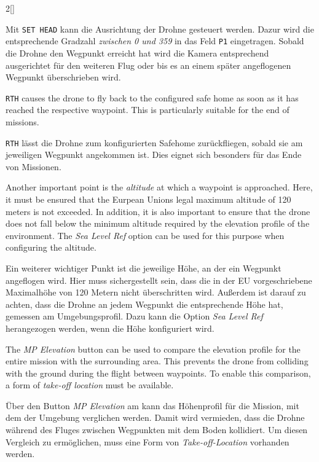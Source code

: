 \begin{paracol}{2}[]
\colger

Mit \texttt{SET HEAD} kann die Ausrichtung der Drohne gesteuert werden. Dazur wird die entsprechende Gradzahl \textsl{zwischen 0 und 359 }in das Feld \texttt{P1} eingetragen. Sobald die Drohne den Wegpunkt erreicht hat wird die Kamera entsprechend ausgerichtet für den weiteren Flug oder bis es an einem später angeflogenen Wegpunkt überschrieben wird.

\coleng

\texttt{RTH} causes the drone to fly back to the configured safe home as soon as it has reached the respective waypoint. This is particularly suitable for the end of missions.

\colger

\texttt{RTH} lässt die Drohne zum konfigurierten Safehome zurückfliegen, sobald sie am jeweiligen Wegpunkt angekommen ist. Dies eignet sich besonders für das Ende von Missionen.

\coleng

Another important point is the \textsl{altitude} at which a waypoint is approached. Here, it must be ensured that the Eurpean Unions legal maximum altitude of 120 meters is not exceeded. In addition, it is also important to ensure that the drone does not fall below the minimum altitude required by the elevation profile of the environment. The \textsl{Sea Level Ref} option can be used for this purpose when configuring the altitude.

\colger

Ein weiterer wichtiger Punkt ist die jeweilige Höhe, an der ein Wegpunkt angeflogen wird. Hier muss sichergestellt sein, dass die in der EU vorgeschriebene Maximalhöhe von 120 Metern nicht überschritten wird. Außerdem ist darauf zu achten, dass die Drohne an jedem Wegpunkt die entsprechende Höhe hat, gemessen am Umgebungsprofil. Dazu kann die Option \textsl{Sea Level Ref} herangezogen werden, wenn die Höhe konfiguriert wird.

\coleng

The \textsl{MP Elevation} button can be used to compare the elevation profile for the entire mission with the surrounding area. This prevents the drone from colliding with the ground during the flight between waypoints. To enable this comparison, a form of \textsl{take-off location} must be available.

\colger

Über den Button \textsl{MP Elevation} am kann das Höhenprofil für die Mission, mit dem der Umgebung verglichen werden. Damit wird vermieden, dass die Drohne während des Fluges zwischen Wegpunkten mit dem Boden kollidiert. Um diesen Vergleich zu ermöglichen, muss eine Form von \textsl{Take-off-Location }vorhanden werden.


\end{paracol}
